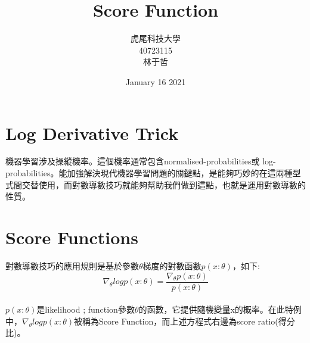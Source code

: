 \documentclass[12pt,a4paper]{article}
\title{Score Function}
\author{虎尾科技大學\\40723115\\ 林于哲}
\date{January 16 2021}
\begin{document}
\maketitle
\tableofcontents

\section{Log Derivative Trick}
機器學習涉及操縱機率。這個機率通常包含normalised-probabilities或 log-probabilities。能加強解決現代機器學習問題的關鍵點，是能夠巧妙的在這兩種型式間交替使用，而對數導數技巧就能夠幫助我們做到這點，也就是運用對數導數的性質。\\
\section{Score Functions}
對數導數技巧的應用規則是基於參數$\theta$梯度的對數函數$p(x:\theta)$，如下:\\
$$\nabla_\theta logp(x:\theta)=\frac{\nabla_\theta p(x:\theta)}{p(x:\theta)}$$\\
$p(x:\theta)$是likelihood ; function參數$\theta$的函數，它提供隨機變量x的概率。在此特例中，$\nabla_\theta logp(x:\theta)$被稱為Score Function，而上述方程式右邊為score ratio(得分比)。\\[6pt]
\end{document}

